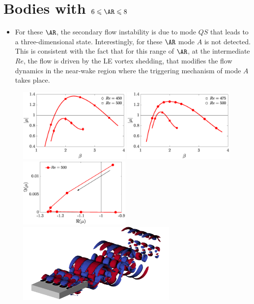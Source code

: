 \documentclass{jfm}
\begin{document}
\section{Bodies with $6 \le \AR \le 8$}

\begin{itemize}
  \item For these $\AR$, the secondary flow instability is due to mode $QS$ that leads to a three-dimensional state. Interestingly, for these $\AR$ mode $A$ is not detected. This is consistent with the fact that for this range of $\AR$, at the intermediate $Re$, the flow is driven by the LE vortex shedding, that modifies the flow dynamics in the near-wake region where the triggering mechanism of mode $A$ takes place. 
\end{itemize}

\begin{figure}
  \centering
  \includegraphics[width=0.49\textwidth]{./fig/AR7s/multipliers_AR6.eps}  
  \includegraphics[width=0.49\textwidth]{./fig/AR7s/multipliers_AR7.eps}
  \includegraphics[width=0.49\textwidth]{./fig/AR7s/multipliers_AR7_b.eps}
  \includegraphics[width=0.7\textwidth]{./fig/AR7s/Floqetmode_beta_2p2_Re500_AR7.png}

\end{figure}
\end{document}

